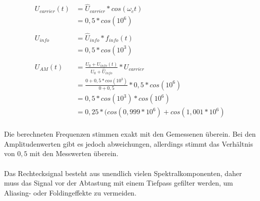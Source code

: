 \begin{center}
  \begin{align*}
    U_{carrier}(t) &= \hat{U}_{carrier} * cos(\omega_c t)\\
		   &= 0,5 * cos(10^6)\\ \\
    U_{info} &= \hat{U}_{info} * f_{info}(t)\\
	     &= 0,5  * cos(10^3)\\ \\
    U_{AM}(t) &= \frac{U_0 + U_{info}(t)}{U_0 + \hat{U}_{info}} * U_{carrier}\\
	      &= \frac{0 + 0,5  * cos(10^3)}{0 + 0,5} * 0,5 * cos(10^6)\\
	      &= 0,5 * cos(10^3) * cos(10^6)\\
	      &= 0,25 * (cos(0,999*10^6) + cos(1,001*10^6)\\
  \end{align*}
\end{center}
\noindent
Die berechneten Frequenzen stimmen exakt mit den Gemessenen überein. Bei den Amplitudenwerten gibt es jedoch abweichungen, allerdings
stimmt das Verhältnis von $0,5$ mit den Messwerten überein.\\
\\
Das Rechtecksignal besteht aus unendlich vielen Spektralkomponenten, daher muss das Signal vor der Abtastung mit einem Tiefpass gefilter werden,
um Aliasing- oder Foldingeffekte zu vermeiden.\\

